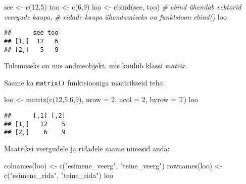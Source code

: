\documentclass[
]{book}
\newenvironment{Shaded}{\begin{snugshade}}{\end{snugshade}}
\newcommand{\AttributeTok}[1]{\textcolor[rgb]{0.77,0.63,0.00}{#1}}
\newcommand{\CommentTok}[1]{\textcolor[rgb]{0.56,0.35,0.01}{\textit{#1}}}
\newcommand{\DecValTok}[1]{\textcolor[rgb]{0.00,0.00,0.81}{#1}}
\newcommand{\FunctionTok}[1]{\textcolor[rgb]{0.00,0.00,0.00}{#1}}
\newcommand{\NormalTok}[1]{#1}
\newcommand{\OtherTok}[1]{\textcolor[rgb]{0.56,0.35,0.01}{#1}}
\newcommand{\StringTok}[1]{\textcolor[rgb]{0.31,0.60,0.02}{#1}}
\begin{document}
\begin{Shaded}
\begin{Highlighting}[]
\NormalTok{see }\OtherTok{\textless{}{-}} \FunctionTok{c}\NormalTok{(}\DecValTok{12}\NormalTok{,}\DecValTok{5}\NormalTok{)}
\NormalTok{too }\OtherTok{\textless{}{-}} \FunctionTok{c}\NormalTok{(}\DecValTok{6}\NormalTok{,}\DecValTok{9}\NormalTok{)}
\NormalTok{loo }\OtherTok{\textless{}{-}} \FunctionTok{cbind}\NormalTok{(see, too) }\CommentTok{\# cbind ühendab vektorid veergude kaupa, }
                       \CommentTok{\# ridade kaupa ühendamiseks on funktsioon rbind()}
\NormalTok{loo}
\end{Highlighting}
\end{Shaded}

\begin{verbatim}
##      see too
## [1,]  12   6
## [2,]   5   9
\end{verbatim}

Tulemuseks on uus andmeobjekt, mis kuulub klassi \emph{matrix}.

Saame ka \texttt{matrix()} funktsiooniga maatrikseid teha:

\begin{Shaded}
\begin{Highlighting}[]
\NormalTok{loo }\OtherTok{\textless{}{-}} \FunctionTok{matrix}\NormalTok{(}\FunctionTok{c}\NormalTok{(}\DecValTok{12}\NormalTok{,}\DecValTok{5}\NormalTok{,}\DecValTok{6}\NormalTok{,}\DecValTok{9}\NormalTok{), }\AttributeTok{nrow =} \DecValTok{2}\NormalTok{, }\AttributeTok{ncol =} \DecValTok{2}\NormalTok{, }\AttributeTok{byrow =}\NormalTok{ T)}
\NormalTok{loo}
\end{Highlighting}
\end{Shaded}

\begin{verbatim}
##      [,1] [,2]
## [1,]   12    5
## [2,]    6    9
\end{verbatim}

Maatriksi veergudele ja ridadele saame nimesid anda:

\begin{Shaded}
\begin{Highlighting}[]
\FunctionTok{colnames}\NormalTok{(loo) }\OtherTok{\textless{}{-}} \FunctionTok{c}\NormalTok{(}\StringTok{"esimene\_veerg"}\NormalTok{, }\StringTok{"teine\_veerg"}\NormalTok{)}
\FunctionTok{rownames}\NormalTok{(loo) }\OtherTok{\textless{}{-}} \FunctionTok{c}\NormalTok{(}\StringTok{"esimene\_rida"}\NormalTok{, }\StringTok{"teine\_rida"}\NormalTok{)}
\NormalTok{loo}
\end{Highlighting}
\end{Shaded}
\end{document}
